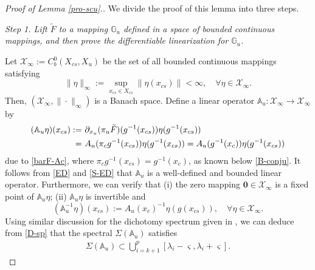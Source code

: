 \documentclass[reqno]{amsart}
\numberwithin{equation}{section}
\begin{document}
\begin{proof}[Proof of Lemma {\rm \ref{pro-scu}}.]
We divide the proof of this lemma into three steps.

{\em Step 1.
Lift $\tilde{F}$ to a mapping $\mathbb{G}_u$ defined in a space of bounded continuous mappings,
and then prove the differentiable linearization for $\mathbb{G}_u$.
}

Let $\mathcal{X}_\infty:=C^0_b(X_{cs},X_u)$ be the set of all bounded continuous mappings satisfying
$$
\|\eta\|_\infty:=\sup_{x_{cs}\in X_{cs}} \|\eta(x_{cs})\|<\infty, \quad \forall \eta\in \mathcal{X}_\infty.
$$
Then, $(\mathcal{X}_\infty,\|\cdot\|_\infty)$ is a Banach space.
Define a linear operator $\mathbb{A}_u: \mathcal{X}_\infty\to \mathcal{X}_\infty$ by
\begin{align}\label{Auu-g}
(\mathbb{A}_u \eta )(x_{cs}): =&~ \partial_{x_u}(\pi_u \tilde{F})(g^{-1}(x_{cs}))\eta(g^{-1}(x_{cs}))
\notag \\
=&~A_u(\pi_c g^{-1}(x_{cs}))\eta(g^{-1}(x_{cs}))= A_u(g^{-1}(x_{c}))  \eta(g^{-1}(x_{cs})) %
\end{align}
due to \eqref{barF-Ac}, where $\pi_c g^{-1}(x_{cs})=g^{-1}(x_c)$, as known below \eqref{B-conju}.
It follows from \eqref{ED} and  \eqref{S-ED} that $\mathbb{A}_u$ is a well-defined and bounded linear operator.
  Furthermore, we can verify that (i) the zero mapping $\mathbf{0} \in \mathcal{X}_\infty$ is a  fixed point of $\mathbb{A}_u \eta$;
(ii) $\mathbb{A}_u \eta$ is invertible and
$$
(\mathbb{A}_u^{-1} \eta)(x_{cs}):= A_u(x_{c})^{-1} \eta(g(x_{cs})), \quad \forall \eta\in \mathcal{X}_\infty.
$$
Using similar discussion for the dichotomy spectrum given in \cite[Section 3]{DZZ-MZ}, we can deduce from \eqref{D-sp} that
the spectral $\Sigma(\mathbb{A}_u)$ satisfies
\begin{align}\label{u-sp}
\Sigma(\mathbb{A}_u)\subset \bigcup_{i=k+1}^p [\lambda_i-\varsigma,\lambda_i+\varsigma].
\end{align}



\end{proof}
\end{document}
